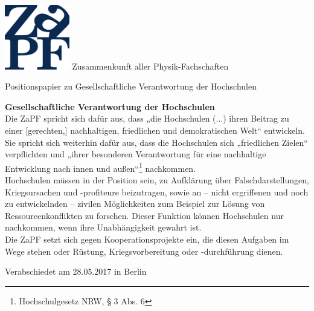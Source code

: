 \documentclass[DIV=calc]{scrartcl}
\begin{document}
    \hspace{0.87\textwidth}
    \begin{minipage}{120pt}
        \vspace{-1.8cm}
        \includegraphics[width=80pt]{logo.pdf}
        \centering
        \small Zusammenkunft aller Physik-Fachschaften
    \end{minipage}
    \begin{center}
        \huge{Positionspapier zu Gesellschaftliche Verantwortung der Hochschulen} \\
        \normalsize
    \end{center}
    
    \vspace{1cm}    
    
\textbf{Gesellschaftliche Verantwortung der Hochschulen}\\

Die ZaPF spricht sich dafür aus, dass „die Hochschulen (...) ihren Beitrag zu einer [gerechten,] nachhaltigen, friedlichen und demokratischen Welt“
entwickeln. Sie spricht sich weiterhin dafür aus, dass die Hochschulen sich „friedlichen Zielen“ verpflichten und „ihrer besonderen Verantwortung für
eine nachhaltige Entwicklung nach innen und außen“\footnote{Hochschulgesetz NRW, § 3 Abs. 6} nachkommen.\\

Hochschulen müssen in der Position sein, zu Aufklärung über Falschdarstellungen, Kriegsursachen und -profiteure beizutragen, sowie an – nicht
ergriffenen und noch zu entwickelnden – zivilen Möglichkeiten zum Beispiel zur Lösung von Ressourcenkonflikten zu forschen. Dieser Funktion können
Hochschulen nur nachkommen, wenn ihre Unabhängigkeit gewahrt ist.\\

Die ZaPF setzt sich gegen Kooperationsprojekte ein, die diesen Aufgaben im Wege stehen oder Rüstung, Kriegsvorbereitung oder -durchführung dienen.
    \vfill
    \begin{flushright}
        Verabschiedet am 28.05.2017 in Berlin
    \end{flushright}
    
\end{document}
